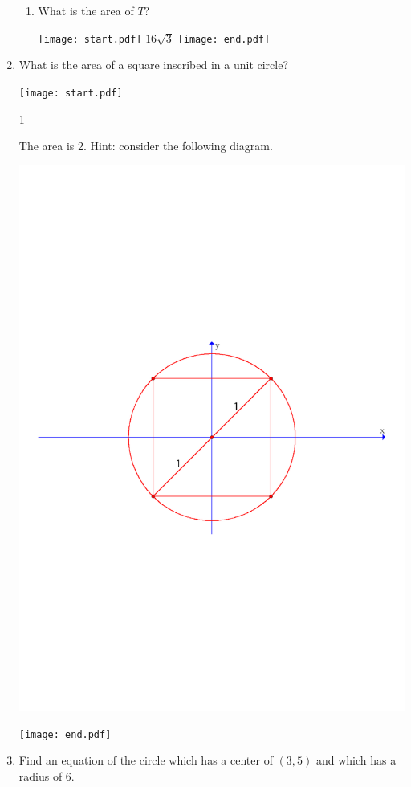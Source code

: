 \documentclass[12pt]{article}
\begin{document}
\begin{enumerate}
\begin{enumerate}
\item What is the area of $T$?

\texttt{[image: start.pdf]}
{$16\sqrt{3}$}
\texttt{[image: end.pdf]}


\end{enumerate}

\newpage

\item What is the area of a square inscribed in a unit circle?

\texttt{[image: start.pdf]}
{{1\linewidth}{The area is 2. Hint: consider the following diagram.
\begin{center}
\includegraphics[scale=0.5]{inscribed.pdf}
\end{center}}}
\texttt{[image: end.pdf]}


\item Find an equation of the circle which has a center of $(3,5)$ and which has a radius of 6.


\end{enumerate}
\end{document}
